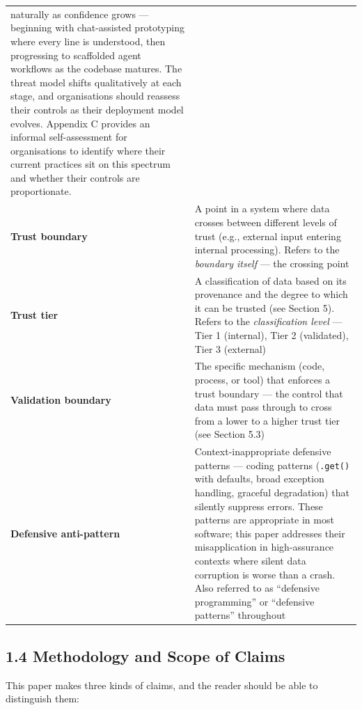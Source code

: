 \documentclass[a4paper,11pt]{report}
\begin{document}
\begin{longtable}[]{@{}
  >{\raggedright\arraybackslash}p{}
  >{\raggedright\arraybackslash}p{}@{}}
naturally as confidence grows --- beginning with chat-assisted
prototyping where every line is understood, then progressing to
scaffolded agent workflows as the codebase matures. The threat model
shifts qualitatively at each stage, and organisations should reassess
their controls as their deployment model evolves. Appendix C provides an
informal self-assessment for organisations to identify where their
current practices sit on this spectrum and whether their controls are
proportionate. \\
\textbf{Trust boundary} & A point in a system where data crosses between
different levels of trust (e.g., external input entering internal
processing). Refers to the \emph{boundary itself} --- the crossing
point \\
\textbf{Trust tier} & A classification of data based on its provenance
and the degree to which it can be trusted (see Section 5). Refers to the
\emph{classification level} --- Tier 1 (internal), Tier 2 (validated),
Tier 3 (external) \\
\textbf{Validation boundary} & The specific mechanism (code, process, or
tool) that enforces a trust boundary --- the control that data must pass
through to cross from a lower to a higher trust tier (see Section
5.3) \\
\textbf{Defensive anti-pattern} & Context-inappropriate defensive
patterns --- coding patterns (\texttt{.get()} with defaults, broad
exception handling, graceful degradation) that silently suppress errors.
These patterns are appropriate in most software; this paper addresses
their misapplication in high-assurance contexts where silent data
corruption is worse than a crash. Also referred to as ``defensive
programming'' or ``defensive patterns'' throughout \\
\end{longtable}

\hypertarget{methodology-and-scope-of-claims}{%
\subsection{1.4 Methodology and Scope of
Claims}\label{methodology-and-scope-of-claims}}

This paper makes three kinds of claims, and the reader should be able to
distinguish them:
\end{document}
